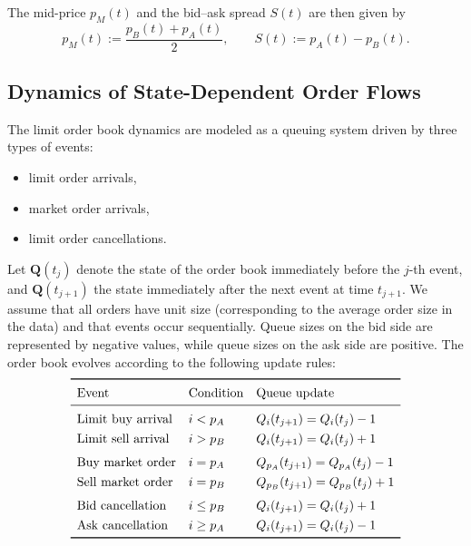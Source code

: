 \documentclass[11pt]{article}
\begin{document}
The mid-price $p_M(t)$ and the bid--ask spread $S(t)$ are then given by
\begin{equation}
p_M(t) := \frac{p_B(t)+p_A(t)}{2},
\qquad
S(t) := p_A(t)-p_B(t).
\end{equation}

\subsection{Dynamics of State-Dependent Order Flows}\label{orderflow}
The limit order book dynamics are modeled as a queuing system driven by three types of events:
\begin{itemize}
    \item limit order arrivals,
    \item market order arrivals,
    \item limit order cancellations.
\end{itemize}

Let $\boldsymbol{Q}(t_j)$ denote the state of the order book immediately before the $j$-th event, and $\boldsymbol{Q}(t_{j+1})$ the state immediately after the next event at time $t_{j+1}$. We assume that all orders have unit size (corresponding to the average order size in the data) and that events occur sequentially. Queue sizes on the bid side are represented by negative values, while queue sizes on the ask side are positive. The order book evolves according to the following update rules:
\begin{equation}\label{eq:update_rules}
\renewcommand{\arraystretch}{1.3}
\begin{array}{lll}
\toprule
\text{Event} & \text{Condition} & \text{Queue update} \\ 
\midrule
\text{Limit buy arrival}  & i<p_A   & Q_i(t_{j+1}) = Q_i(t_j)-1 \\ 
\text{Limit sell arrival} & i>p_B   & Q_i(t_{j+1}) = Q_i(t_j)+1 \\[0.3em]
\text{Buy market order}   & i=p_A   & Q_{p_A}(t_{j+1}) = Q_{p_A}(t_j)-1 \\ 
\text{Sell market order}  & i=p_B   & Q_{p_B}(t_{j+1}) = Q_{p_B}(t_j)+1 \\[0.3em]
\text{Bid cancellation}   & i\le p_B & Q_i(t_{j+1}) = Q_i(t_j)+1 \\ 
\text{Ask cancellation}   & i\ge p_A & Q_i(t_{j+1}) = Q_i(t_j)-1 \\ 
\bottomrule
\end{array}
\end{equation}
\end{document}
